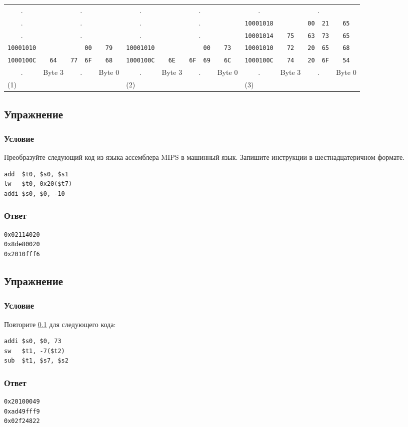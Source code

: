 \documentclass[12pt]{article}
\newenvironment{e}[1][dummy label]{
    \subsection{Упражнение}\label{#1}
    \subsubsection*{Условие}
    }{
    \subsubsection*{Ответ}
}
\newcommand{\eref}[1]{\hyperref[{e:#1}]{\nameref*{e:#1} \ref*{e:#1}}}
\begin{document}
\begin{enumerate}
\begin{table}[h!]
\begin{tabular}{ccccccccccccccc}
                . & \multicolumn{4}{c}{.} & . & \multicolumn{4}{c}{.} & . & \multicolumn{4}{c}{.} \\
                . & \multicolumn{4}{c}{.} & . & \multicolumn{4}{c}{.} & \texttt{10001018} & & \texttt{00} & \texttt{21} & \texttt{65} \\
                . & \multicolumn{4}{c}{.} & . & \multicolumn{4}{c}{.} & \texttt{10001014} & \texttt{75} & \texttt{63} & \texttt{73} & \texttt{65} \\
                \texttt{10001010} & & & \texttt{00} & \texttt{79} & \texttt{10001010} & & & \texttt{00} & \texttt{73} & \texttt{10001010} &\texttt{72} & \texttt{20} & \texttt{65} & \texttt{68} \\
                \texttt{1000100C} & \texttt{64} & \texttt{77} & \texttt{6F} & \texttt{68} & \texttt{1000100C} & \texttt{6E} & \texttt{6F} & \texttt{69} & \texttt{6C} & \texttt{1000100C} & \texttt{74} & \texttt{20} & \texttt{6F} & \texttt{54} \\
                . & \multicolumn{1}{l}{ {\scriptsize Byte 3}} & \multicolumn{2}{c}{.} & \multicolumn{1}{r}{ {\scriptsize Byte 0}} & . & \multicolumn{1}{l}{ {\scriptsize Byte 3}} & \multicolumn{2}{c}{.} & \multicolumn{1}{r}{ {\scriptsize Byte 0}} & . & \multicolumn{1}{l}{ {\scriptsize Byte 3}} & \multicolumn{2}{c}{.} & \multicolumn{1}{r}{ {\scriptsize Byte 0}} \\
                \multicolumn{5}{l}{(1)} & \multicolumn{5}{l}{(2)} & \multicolumn{5}{l}{(3)} \\
            \end{tabular}
        \end{table}
    \end{enumerate}

    \begin{e}[e:asm]
        Преобразуйте следующий код из языка ассемблера MIPS в машинный язык. Запишите инструкции в шестнадцатеричном формате.
        \begin{verbatim}
add  $t0, $s0, $s1
lw   $t0, 0x20($t7)
addi $s0, $0, -10
        \end{verbatim}
    \end{e}
    \begin{verbatim}
0x02114020
0x8de80020
0x2010fff6
    \end{verbatim}

    \newpage

    \begin{e}[e:asm2]
        Повторите \eref{asm} для следующего кода:
        \begin{verbatim}
addi $s0, $0, 73
sw   $t1, -7($t2)
sub  $t1, $s7, $s2
        \end{verbatim}
    \end{e}
    \begin{verbatim}
0x20100049
0xad49fff9
0x02f24822
    \end{verbatim}
\end{document}
